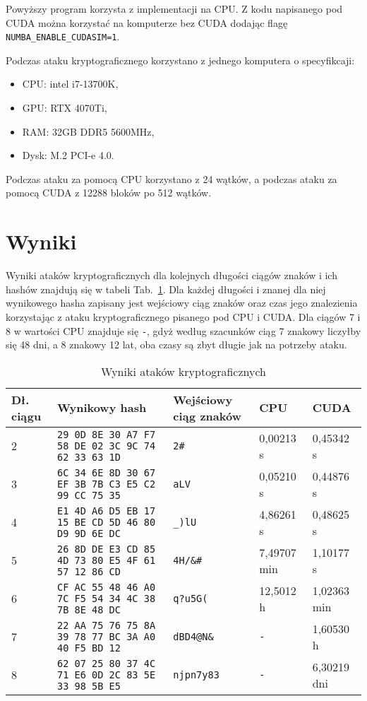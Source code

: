\documentclass[polish,envcountsect,10pt]{article}
\begin{document}
Powyższy program korzysta z implementacji na CPU. Z kodu napisanego pod CUDA można korzystać na komputerze bez CUDA dodając flagę \texttt{NUMBA\_ENABLE\_CUDASIM=1}. 

Podczas ataku kryptograficznego korzystano z jednego komputera o specyfikcaji:
\begin{itemize}
	\item CPU: intel i7-13700K,
	\item GPU: RTX 4070Ti,
	\item RAM: 32GB DDR5 5600MHz,
	\item Dysk: M.2 PCI-e 4.0.
\end{itemize}
Podczas ataku za pomocą CPU korzystano z 24 wątków, a podczas ataku za pomocą CUDA z 12288 bloków po 512 wątków.

\section{Wyniki}
Wyniki ataków kryptograficznych dla kolejnych długości ciągów znaków i ich hashów znajdują się w tabeli Tab.~\ref{tab:results}. 
Dla każdej długości i znanej dla niej wynikowego hasha zapisany jest wejściowy ciąg znaków oraz czas jego znalezienia korzystając z ataku kryptograficznego pisanego pod CPU i CUDA.
Dla ciągów 7 i 8 w wartości CPU znajduje się \texttt{-}, gdyż według szacunków ciąg 7 znakowy liczyłby się 48 dni, a 8 znakowy 12 lat, oba czasy są zbyt długie jak na potrzeby ataku.
\begin{table}[H]
	\caption{Wyniki ataków kryptograficznych}
	\centering
	\label{tab:results}
	\begin{tabular}{|p{1.5cm}|p{4.5cm}|p{2cm}|p{2cm}|p{2cm}|}
		\hline
		Dł. ciągu	& Wynikowy hash												& Wejściowy ciąg znaków	& CPU			& CUDA			\\
		\hline
		2			& \texttt{29 0D 8E 30 A7 F7 58 DE 02 3C 9C 74 62 33 63 1D}	& \texttt{2\#} 			& 0,00213 s 	& 0,45342 s		\\
		\hline
		3			& \texttt{6C 34 6E 8D 30 67 EF 3B 7B C3 E5 C2 99 CC 75 35}	& \texttt{aLV} 			& 0,05210 s 	& 0,44876 s		\\
		\hline
		4			& \texttt{E1 4D A6 D5 EB 17 15 BE CD 5D 46 80 D9 9D 6E DC}	& \texttt{\_)lU} 		& 4,86261 s 	& 0,48625 s		\\
		\hline
		5			& \texttt{26 8D DE E3 CD 85 4D 73 80 E5 4F 61 57 12 86 CD}	& \texttt{4H/\&\#} 		& 7,49707 min 	& 1,10177 s		\\
		\hline
		6			& \texttt{CF AC 55 48 46 A0 7C F5 54 34 4C 38 7B 8E 48 DC}	& \texttt{q?u5G(} 		& 12,5012 h		& 1,02363 min	\\
		\hline
		7			& \texttt{22 AA 75 76 75 8A 39 78 77 BC 3A A0 40 F5 BD 12}	& \texttt{dBD4@N\&} 	& \texttt{-} 	& 1,60530 h		\\
		\hline
		8			& \texttt{62 07 25 80 37 4C 71 E6 0D 2C 83 5E 33 98 5B E5}	& \texttt{njpn7y83} 	& \texttt{-} 	& 6,30219 dni	\\
		\hline
	\end{tabular}
\end{table}
\end{document}
